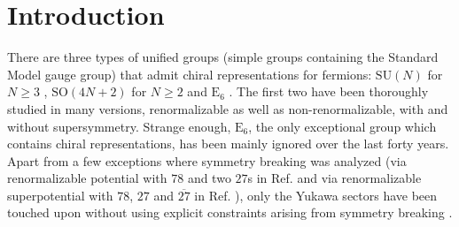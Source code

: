 \documentclass[a4paper,12pt]{article}
\def\SU{\mathrm{SU}}
\def\SO{\mathrm{SO}}
\def\EE{\mathrm{E}_6}
\begin{document}
\tableofcontents



\section{Introduction}

There are three types of unified groups (simple groups containing the Standard Model gauge group)
that admit chiral representations for fermions: $\SU(N)$ for $N\geq 3$ \cite{Georgi:1974sy},
$\SO(4N+2)$ for $N\ge 2$ and $\EE$ \cite{Gursey:1975ki}. The first two have been thoroughly studied
in many versions, renormalizable as well as non-renormalizable, with and without supersymmetry. Strange enough, $\EE$, the only exceptional group
which contains chiral representations, has been mainly ignored over the last forty years. Apart from a few exceptions where symmetry
breaking was analyzed (via renormalizable potential with $78$ and two $27$s in Ref. \cite{Kalashnikov:1979dq} and via
renormalizable superpotential with $78$, $27$ and $\overline{27}$ in Ref. \cite{Buccella:1987kc}), only the Yukawa sectors
have been touched upon without using explicit constraints arising from symmetry breaking \cite{Gursey:1978fu,Achiman:1978vg,Shafi:1978gg,Ruegg:1979fr,Barbieri:1980vc,Shaw:1980ku}.
\end{document}
